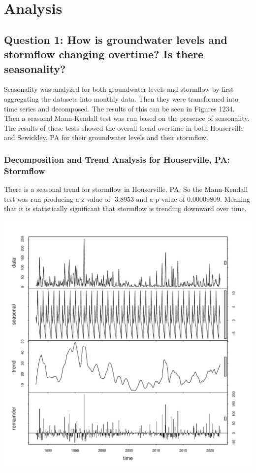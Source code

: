 \documentclass[
  12pt,
]{article}
\begin{document}
\newpage

\hypertarget{analysis}{%
\section{Analysis}\label{analysis}}

\hypertarget{question-1-how-is-groundwater-levels-and-stormflow-changing-overtime-is-there-seasonality}{%
\subsection{Question 1: How is groundwater levels and stormflow changing
overtime? Is there
seasonality?}\label{question-1-how-is-groundwater-levels-and-stormflow-changing-overtime-is-there-seasonality}}

Seasonality was analyzed for both groundwater levels and stormflow by
first aggregating the datasets into monthly data. Then they were
transformed into time series and decomposed. The results of this can be
seen in Figures 1234. Then a seasonal Mann-Kendall test was run based on
the presence of seasonality. The results of these tests showed the
overall trend overtime in both Houserville and Sewickley, PA for their
groundwater levels and their stormflow.

\hypertarget{decomposition-and-trend-analysis-for-houserville-pa-stormflow}{%
\subsubsection{Decomposition and Trend Analysis for Houserville, PA:
Stormflow}\label{decomposition-and-trend-analysis-for-houserville-pa-stormflow}}

There is a seasonal trend for stormflow in Houserville, PA. So the
Mann-Kendall test was run producing a z value of -3.8953 and a p-value
of 0.00009809. Meaning that it is statistically significant that
stormflow is trending downward over time.

\includegraphics{Draft_Final_files/figure-latex/seasonality-1.pdf}
\end{document}
